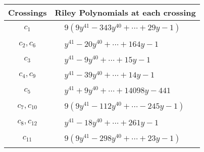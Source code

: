 \documentclass[1p]{elsarticle_modified}
\theoremstyle{definition}
\begin{document}
\begin{tabular}{m{50pt}|m{274pt}}
Crossings & \hspace{64pt}Riley Polynomials at each crossing \\
\hline $$\begin{aligned}c_{1}\end{aligned}$$&$\begin{aligned}
&9(9 y^{41}-343 y^{40}+\cdots+29 y-1)
\end{aligned}$\\
\hline $$\begin{aligned}c_{2},c_{6}\end{aligned}$$&$\begin{aligned}
&y^{41}-20 y^{40}+\cdots+164 y-1
\end{aligned}$\\
\hline $$\begin{aligned}c_{3}\end{aligned}$$&$\begin{aligned}
&y^{41}-9 y^{40}+\cdots+15 y-1
\end{aligned}$\\
\hline $$\begin{aligned}c_{4},c_{9}\end{aligned}$$&$\begin{aligned}
&y^{41}-39 y^{40}+\cdots+14 y-1
\end{aligned}$\\
\hline $$\begin{aligned}c_{5}\end{aligned}$$&$\begin{aligned}
&y^{41}+9 y^{40}+\cdots+14098 y-441
\end{aligned}$\\
\hline $$\begin{aligned}c_{7},c_{10}\end{aligned}$$&$\begin{aligned}
&9(9 y^{41}-112 y^{40}+\cdots-245 y-1)
\end{aligned}$\\
\hline $$\begin{aligned}c_{8},c_{12}\end{aligned}$$&$\begin{aligned}
&y^{41}-18 y^{40}+\cdots+261 y-1
\end{aligned}$\\
\hline $$\begin{aligned}c_{11}\end{aligned}$$&$\begin{aligned}
&9(9 y^{41}-298 y^{40}+\cdots+23 y-1)
\end{aligned}$\\
\hline
\end{tabular}\\~\\
\end{document}
